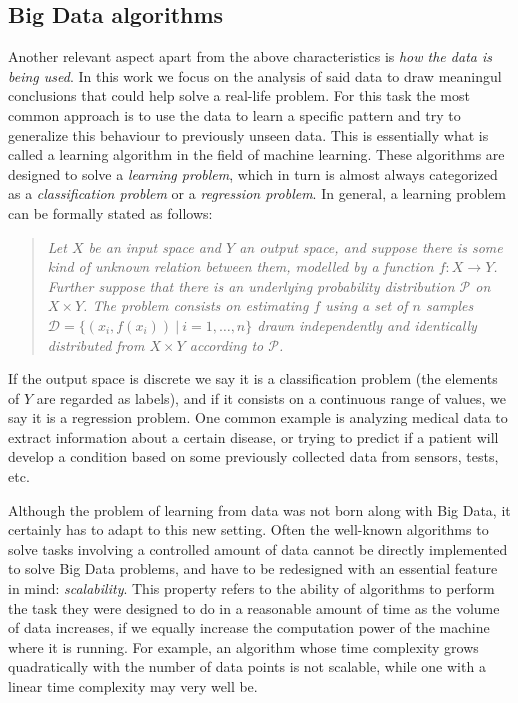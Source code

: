 \subsection{Big Data algorithms}

Another relevant aspect apart from the above characteristics is \textit{how the data is being used}. In this work we focus on the analysis of said data to draw meaningul conclusions that could help solve a real-life problem. For this task the most common approach is to use the data to learn a specific pattern and try to generalize this behaviour to previously unseen data. This is essentially what is called a learning algorithm in the field of machine learning. These algorithms are designed to solve a \textit{learning problem}, which in turn is almost always categorized as a \textit{classification problem} or a \textit{regression problem}.
In general, a learning problem can be formally stated as follows:

\begin{quotation}
  \itshape \noindent
  Let $X$ be an input space and $Y$ an output space, and suppose there is some kind of unknown relation between them, modelled by a function $f:X\to Y$. Further suppose that there is an underlying probability distribution $\mathcal P$ on $X \times Y$. The problem consists on estimating $f$ using a set of $n$ samples $\mathcal D = \{ (x_i, f(x_i)) \ | \ i = 1,\dots,n \}$ drawn independently and identically distributed from $X \times Y$ according to $\mathcal P$.
\end{quotation}
If the output space is discrete we say it is a classification problem (the elements of $Y$ are regarded as labels), and if it consists on a continuous range of values, we say it is a regression problem. One common example is analyzing medical data to extract information about a certain disease, or trying to predict if a patient will develop a condition based on some previously collected data from sensors, tests, etc.

Although the problem of learning from data was not born along with Big Data, it certainly has to adapt to this new setting. Often the well-known algorithms to solve tasks involving a controlled amount of data cannot be directly implemented to solve Big Data problems, and have to be redesigned with an essential feature in mind: \textit{scalability}. This property refers to the ability of algorithms to perform the task they were designed to do in a reasonable amount of time as the volume of data increases, if we equally increase the computation power of the machine where it is running. For example, an algorithm whose time complexity grows quadratically with the number of data points is not scalable, while one with a linear time complexity may very well be.

